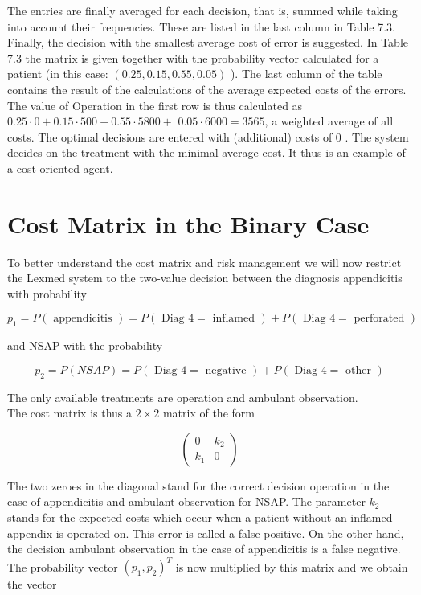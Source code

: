 \documentclass[10pt]{book}
\begin{document}
\begin{center}
\begin{enumerate}
The entries are finally averaged for each decision, that is, summed while taking into account their frequencies. These are listed in the last column in Table 7.3. Finally, the decision with the smallest average cost of error is suggested. In Table 7.3 the matrix is given together with the probability vector calculated for a patient (in this case: $(0.25,0.15,0.55,0.05)$ ). The last column of the table contains the result of the calculations of the average expected costs of the errors. The value of Operation in the first row is thus calculated as $0.25 \cdot 0+0.15 \cdot 500+0.55 \cdot 5800+$ $0.05 \cdot 6000=3565$, a weighted average of all costs. The optimal decisions are entered with (additional) costs of 0 . The system decides on the treatment with the minimal average cost. It thus is an example of a cost-oriented agent.

\section*{Cost Matrix in the Binary Case}
To better understand the cost matrix and risk management we will now restrict the Lexmed system to the two-value decision between the diagnosis appendicitis with probability

$$
p_{1}=P(\text { appendicitis })=P(\text { Diag } 4=\text { inflamed })+P(\text { Diag } 4=\text { perforated })
$$

and NSAP with the probability

$$
p_{2}=P(N S A P)=P(\text { Diag } 4=\text { negative })+P(\text { Diag } 4=\text { other })
$$

The only available treatments are operation and ambulant observation.\\
The cost matrix is thus a $2 \times 2$ matrix of the form

$$
\left(\begin{array}{cc}
0 & k_{2} \\
k_{1} & 0
\end{array}\right)
$$

The two zeroes in the diagonal stand for the correct decision operation in the case of appendicitis and ambulant observation for NSAP. The parameter $k_{2}$ stands for the expected costs which occur when a patient without an inflamed appendix is operated on. This error is called a false positive. On the other hand, the decision ambulant observation in the case of appendicitis is a false negative. The probability vector $\left(p_{1}, p_{2}\right)^{T}$ is now multiplied by this matrix and we obtain the vector


\end{enumerate}
\end{center}
\end{document}
